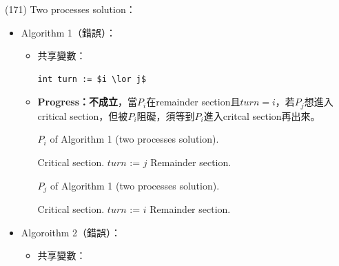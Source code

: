 \begin{theorem}{(171)} Two processes solution：\begin{itemize}
        \item Algorithm 1（錯誤）：\begin{itemize}
            \item 共享變數：\begin{lstlisting}[caption={Shared variables of Algorithm 1 (two processes solution).}, captionpos=b, mathescape=true]
                int turn := $i \lor j$
            \end{lstlisting}
            \item \textbf{Progress：不成立}，當$P_i$在remainder section且$turn = i$，若$P_j$想進入critical section，但被$P_i$阻礙，須等到$P_i$進入critcal section再出來。
            \begin{algorithm}[H]
                \caption{$P_i$ of Algorithm 1 (two processes solution).}
                \begin{algorithmic}[1]
                        \Repeat 
                            \EndWhile
                            \State Critical section.
                            \State $turn$ := $j$
                            \State Remainder section.
                    \EndFunction
                \end{algorithmic}
            \end{algorithm} 
            \begin{algorithm}[H]
                \caption{$P_j$ of Algorithm 1 (two processes solution).}
                \begin{algorithmic}[1]
                        \Repeat 
                            \EndWhile
                            \State Critical section.
                            \State $turn$ := $i$
                            \State Remainder section.
                    \EndFunction
                \end{algorithmic}
            \end{algorithm} 
        \end{itemize}
        \item Algoroithm 2（錯誤）：\begin{itemize}
            \item 共享變數：\begin{lstlisting}[caption={Shared variables of Algorithm 2 (two processes solution).}, captionpos=b, mathescape=true]

\end{lstlisting}
\end{itemize}
\end{itemize}
\end{theorem}
